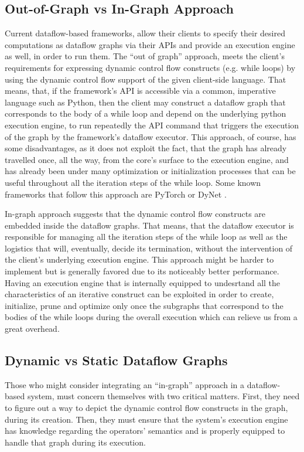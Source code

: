 \documentclass[ack,preface]{dithesis}
\begin{document}
    \subsection{Out-of-Graph vs In-Graph Approach}
Current dataflow-based frameworks, allow their clients to specify their desired computations as dataflow graphs via their APIs and provide an execution engine as well, in order to run them. The “out of graph” approach, meets the client’s requirements for expressing dynamic control flow constructs (e.g. while loops) by using the dynamic control flow support of the given client-side language. That means, that, if the framework’s API is accessible via a common, imperative language such as Python, then the client may construct a dataflow graph that corresponds to the body of a while loop and depend on the underlying python execution engine, to run repeatedly the API command that triggers the execution of the graph by the framework’s dataflow executor. This approach, of course, has some disadvantages, as it does not exploit the fact, that the graph has already travelled once, all the way, from the core’s surface to the execution engine, and has already been under many optimization or initialization processes that can be useful throughout all the iteration steps of the while loop.
Some known frameworks that follow this approach are  PyTorch \cite{Paszke2017} or DyNet  \cite{ Neubig2017DyNetTD}.

In-graph approach suggests that the dynamic control flow constructs are embedded inside the dataflow graphs. That means, that the dataflow executor is responsible for managing all the iteration steps of the while loop as well as the logistics that will, eventually, decide its termination, without the intervention of the client’s underlying execution engine.
This approach might be harder to implement but is generally favored due to its noticeably better performance.  \cite{Yu:2018} Having an execution engine that is internally equipped to undesrtand all the characteristics of an iterative construct can be exploited in order to create, initialize, prune and optimize only once the subgraphs that correspond to the bodies of  the while loops during the overall execution which can relieve us from a great overhead.

    \subsection{Dynamic vs Static Dataflow Graphs}
Those who might consider integrating an “in-graph” approach in a dataflow-based system, must concern themselves with two critical matters. First, they need to figure out a way to depict the dynamic control flow constructs in the graph, during its creation. Then, they must ensure that  the system’s execution engine has  knowledge regarding the operators' semantics and is properly equipped to handle that graph during its execution.
\end{document}
